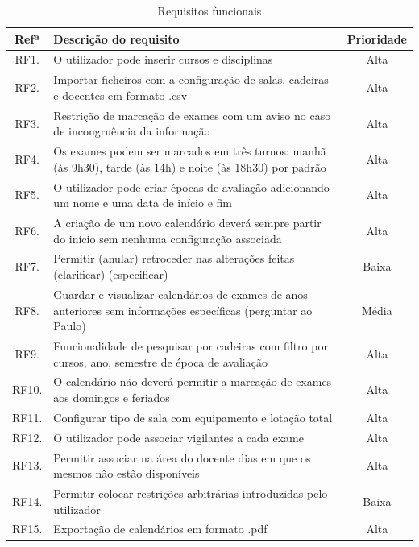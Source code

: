 \documentclass[11pt, twoside]{report}
\begin{document}
\begin{table}[H]
	\caption{Requisitos funcionais}
	\begin{center}	
		\begin{tabularx}{\textwidth}{|c|X|c|}
			\hline
			\textbf{Refª }	& \textbf{Descrição do requisito} & \textbf{Prioridade} \\
			\hline
			RF1. & O utilizador pode inserir cursos e disciplinas & Alta\\
			\hline
			RF2. & Importar ficheiros com a configuração de salas, cadeiras e docentes em formato .csv & Alta \\
			\hline
			RF3. &  Restrição de marcação de exames com um aviso no caso de incongruência da informação & Alta \\
			\hline
			RF4. & Os exames podem ser marcados em três turnos: manhã (às 9h30), tarde (às 14h) e noite (às 18h30) por padrão & Alta \\
			\hline
			RF5. & O utilizador pode criar épocas de avaliação adicionando um nome e uma data de início e fim & Alta \\
			\hline
			RF6. & A criação de um novo calendário deverá sempre partir do início sem nenhuma configuração associada & Alta\\
			\hline
			RF7. & Permitir (anular) retroceder nas alterações feitas (clarificar) (especificar) & Baixa \\
			\hline
			RF8. & Guardar e visualizar calendários de exames de anos anteriores sem informações específicas (perguntar ao Paulo) & Média \\
			\hline
			RF9.  & Funcionalidade de pesquisar por cadeiras com filtro por cursos, ano, semestre de época de avaliação  & Alta \\
			\hline
			RF10. & O calendário não deverá permitir a marcação de exames aos domingos e feriados & Alta \\
			\hline
			RF11. & Configurar tipo de sala com equipamento e lotação total & Alta \\
			\hline
			RF12. & O utilizador pode associar vigilantes a cada exame & Alta \\
			\hline
			RF13. & Permitir associar na área do docente dias em que os mesmos não estão disponíveis & Alta\\
			\hline
			RF14. & Permitir colocar restrições arbitrárias introduzidas pelo utilizador & Baixa \\
			\hline
			RF15. & Exportação de calendários em formato .pdf & Alta \\
			\hline

\end{tabularx}
\end{center}
\end{table}
\end{document}
